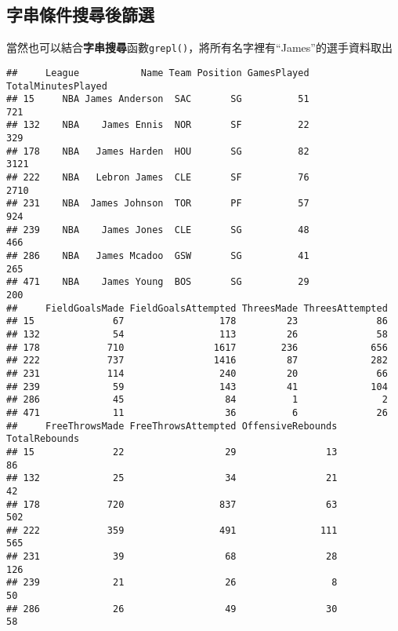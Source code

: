 \documentclass[]{book}
\newenvironment{Shaded}{\begin{snugshade}}{\end{snugshade}}
\newcommand{\KeywordTok}[1]{\textcolor[rgb]{0.13,0.29,0.53}{\textbf{{#1}}}}
\newcommand{\StringTok}[1]{\textcolor[rgb]{0.31,0.60,0.02}{{#1}}}
\newcommand{\NormalTok}[1]{{#1}}
\begin{document}
\subsection{字串條件搜尋後篩選}

當然也可以結合\textbf{字串搜尋}函數\texttt{grepl()}，將所有名字裡有``James''的選手資料取出

\begin{Shaded}
\end{Shaded}

\begin{verbatim}
##     League           Name Team Position GamesPlayed TotalMinutesPlayed
## 15     NBA James Anderson  SAC       SG          51                721
## 132    NBA    James Ennis  NOR       SF          22                329
## 178    NBA   James Harden  HOU       SG          82               3121
## 222    NBA   Lebron James  CLE       SF          76               2710
## 231    NBA  James Johnson  TOR       PF          57                924
## 239    NBA    James Jones  CLE       SG          48                466
## 286    NBA   James Mcadoo  GSW       SG          41                265
## 471    NBA    James Young  BOS       SG          29                200
##     FieldGoalsMade FieldGoalsAttempted ThreesMade ThreesAttempted
## 15              67                 178         23              86
## 132             54                 113         26              58
## 178            710                1617        236             656
## 222            737                1416         87             282
## 231            114                 240         20              66
## 239             59                 143         41             104
## 286             45                  84          1               2
## 471             11                  36          6              26
##     FreeThrowsMade FreeThrowsAttempted OffensiveRebounds TotalRebounds
## 15              22                  29                13            86
## 132             25                  34                21            42
## 178            720                 837                63           502
## 222            359                 491               111           565
## 231             39                  68                28           126
## 239             21                  26                 8            50
## 286             26                  49                30            58

\end{verbatim}
\end{document}
